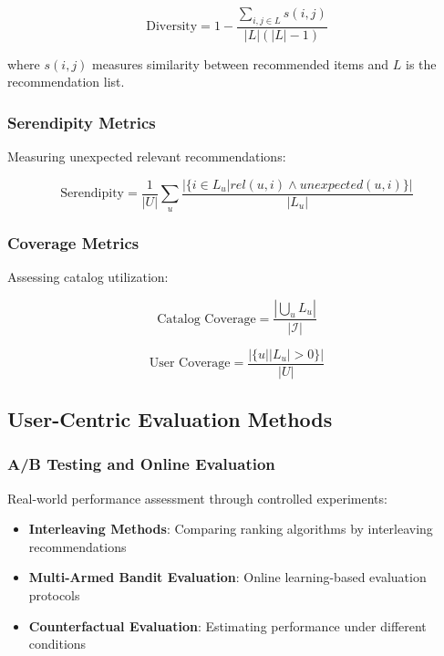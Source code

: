 \documentclass[acmsmall,review,anonymous]{acmart}
\begin{document}
\begin{equation}
\text{Diversity} = 1 - \frac{\sum_{i,j \in L} s(i,j)}{|L|(|L|-1)}
\label{eq:diversity}
\end{equation}

where $s(i,j)$ measures similarity between recommended items and $L$ is the recommendation list.

\subsubsection{Serendipity Metrics}

Measuring unexpected relevant recommendations:

\begin{equation}
\text{Serendipity} = \frac{1}{|U|} \sum_u \frac{|\{i \in L_u | rel(u,i) \land unexpected(u,i)\}|}{|L_u|}
\label{eq:serendipity}
\end{equation}

\subsubsection{Coverage Metrics}

Assessing catalog utilization:

\begin{equation}
\text{Catalog Coverage} = \frac{|\bigcup_u L_u|}{|\mathcal{I}|}
\label{eq:coverage}
\end{equation}

\begin{equation}
\text{User Coverage} = \frac{|\{u | |L_u| > 0\}|}{|U|}
\label{eq:user_coverage}
\end{equation}

\subsection{User-Centric Evaluation Methods}

\subsubsection{A/B Testing and Online Evaluation}

Real-world performance assessment through controlled experiments:

\begin{itemize}
    \item \textbf{Interleaving Methods}: Comparing ranking algorithms by interleaving recommendations
    \item \textbf{Multi-Armed Bandit Evaluation}: Online learning-based evaluation protocols
    \item \textbf{Counterfactual Evaluation}: Estimating performance under different conditions
\end{itemize}
\end{document}
